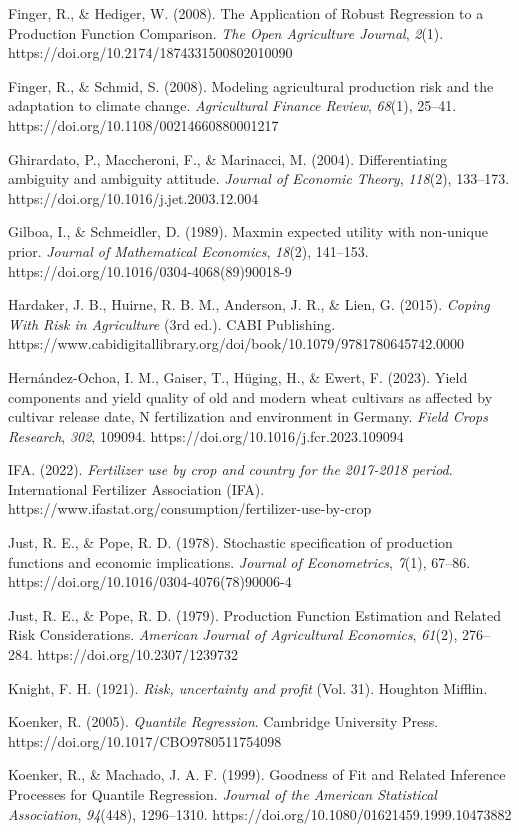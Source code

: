 \documentclass[
]{article}
\begin{document}
Finger, R., \& Hediger, W. (2008). The Application of Robust Regression
to a Production Function Comparison. \emph{The Open Agriculture
Journal}, \emph{2}(1). https://doi.org/10.2174/1874331500802010090

Finger, R., \& Schmid, S. (2008). Modeling agricultural production risk
and the adaptation to climate change. \emph{Agricultural Finance
Review}, \emph{68}(1), 25--41. https://doi.org/10.1108/00214660880001217

Ghirardato, P., Maccheroni, F., \& Marinacci, M. (2004). Differentiating
ambiguity and ambiguity attitude. \emph{Journal of Economic Theory},
\emph{118}(2), 133--173. https://doi.org/10.1016/j.jet.2003.12.004

Gilboa, I., \& Schmeidler, D. (1989). Maxmin expected utility with
non-unique prior. \emph{Journal of Mathematical Economics},
\emph{18}(2), 141--153. https://doi.org/10.1016/0304-4068(89)90018-9

Hardaker, J. B., Huirne, R. B. M., Anderson, J. R., \& Lien, G. (2015).
\emph{Coping With Risk in Agriculture} (3rd ed.). CABI Publishing.
https://www.cabidigitallibrary.org/doi/book/10.1079/9781780645742.0000

Hernández-Ochoa, I. M., Gaiser, T., Hüging, H., \& Ewert, F. (2023).
Yield components and yield quality of old and modern wheat cultivars as
affected by cultivar release date, N fertilization and environment in
Germany. \emph{Field Crops Research}, \emph{302}, 109094.
https://doi.org/10.1016/j.fcr.2023.109094

IFA. (2022). \emph{Fertilizer use by crop and country for the 2017-2018
period}. International Fertilizer Association (IFA).
https://www.ifastat.org/consumption/fertilizer-use-by-crop

Just, R. E., \& Pope, R. D. (1978). Stochastic specification of
production functions and economic implications. \emph{Journal of
Econometrics}, \emph{7}(1), 67--86.
https://doi.org/10.1016/0304-4076(78)90006-4

Just, R. E., \& Pope, R. D. (1979). Production Function Estimation and
Related Risk Considerations. \emph{American Journal of Agricultural
Economics}, \emph{61}(2), 276--284. https://doi.org/10.2307/1239732

Knight, F. H. (1921). \emph{Risk, uncertainty and profit} (Vol. 31).
Houghton Mifflin.

Koenker, R. (2005). \emph{Quantile Regression}. Cambridge University
Press. https://doi.org/10.1017/CBO9780511754098

Koenker, R., \& Machado, J. A. F. (1999). Goodness of Fit and Related
Inference Processes for Quantile Regression. \emph{Journal of the
American Statistical Association}, \emph{94}(448), 1296--1310.
https://doi.org/10.1080/01621459.1999.10473882
\end{document}
